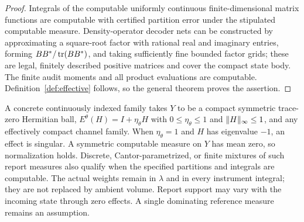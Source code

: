 \begin{proof}
Integrals of the computable uniformly continuous finite-dimensional matrix functions are computable with certified partition error under the stipulated computable measure. Density-operator decoder nets can be constructed by approximating a square-root factor with rational real and imaginary entries, forming $BB^*/\operatorname{tr}(BB^*)$, and taking sufficiently fine bounded factor grids; these are legal, finitely described positive matrices and cover the compact state body. The finite audit moments and all product evaluations are computable. Definition~\ref{def:effective} follows, so the general theorem proves the assertion.
\end{proof}

A concrete continuously indexed family takes $Y$ to be a compact symmetric trace-zero Hermitian ball, $E^\theta(H)=I+\eta_\theta H$ with $0\le\eta_\theta\le1$ and $\lVert H\rVert_\infty\le1$, and any effectively compact channel family. When $\eta_\theta=1$ and $H$ has eigenvalue $-1$, an effect is singular. A symmetric computable measure on $Y$ has mean zero, so normalization holds. Discrete, Cantor-parametrized, or finite mixtures of such report measures also qualify when the specified partitions and integrals are computable. The actual weights remain in $\lambda$ and in every instrument integral; they are not replaced by ambient volume. Report support may vary with the incoming state through zero effects. A single dominating reference measure remains an assumption.
